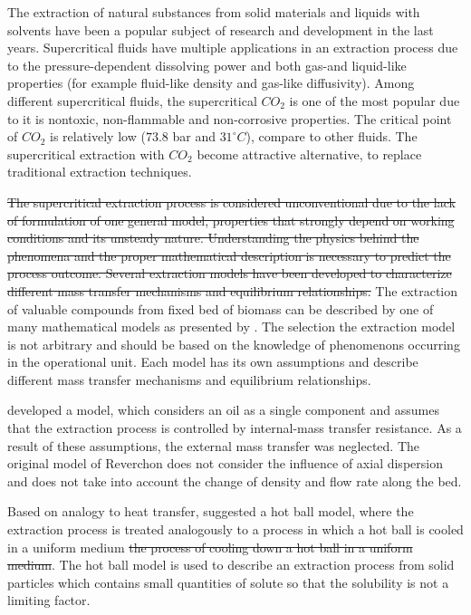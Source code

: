 \documentclass[../Article_Model_Parameters.tex]{subfiles}
\begin{document}
	
	The extraction of natural substances from solid materials and liquids with solvents have been a popular subject of research and development in the last years. Supercritical fluids have multiple applications in an extraction process due to the pressure-dependent dissolving power and {\color{blue} both gas-and liquid-like properties (for example fluid-like density and gas-like diffusivity). Among different supercritical fluids, the supercritical $CO_2$ is one of the most popular due to it is nontoxic, non-flammable and non-corrosive properties. The critical point of $CO_2$ is relatively low ($73.8$ bar and $31 ^\circ C$), compare to other fluids. The supercritical extraction with $CO_2$ become attractive alternative, to replace traditional extraction techniques.}
	
	\sout{The supercritical extraction process is considered unconventional due to the lack of formulation of one general model, properties that strongly depend on working conditions and its unsteady nature. Understanding the physics behind the phenomena and the proper mathematical description is necessary to predict the process outcome. Several extraction models have been developed to characterize different mass transfer mechanisms and equilibrium relationships.}
	{\color{blue}The extraction of valuable compounds from fixed bed of biomass can be described by one of many mathematical models as presented by \citet{Huang2012}. The selection the extraction model is not arbitrary and should be based on the knowledge of phenomenons occurring in the operational unit. Each model has its own assumptions and describe different mass transfer mechanisms and equilibrium relationships}. 
	
	\citet{Reverchon1996} developed a model, which considers an oil as a single component and assumes that the extraction process is controlled by internal-mass transfer resistance. As a result of these assumptions, the external mass transfer was neglected. The original model of Reverchon does not consider the influence of axial dispersion and does not take into account the change of density and flow rate along the bed. 
	
	Based on analogy to heat transfer, \citet{Reverchon1993} suggested a hot ball model, where the extraction process is treated analogously to {\color{blue} a process in which a hot ball is cooled in a uniform medium} \sout{the process of cooling down a hot ball in a uniform medium}. {\color{blue}The hot ball model is used to describe an extraction process from solid particles which contains small quantities of solute so that the solubility is not a limiting factor. }
	
\end{document}
